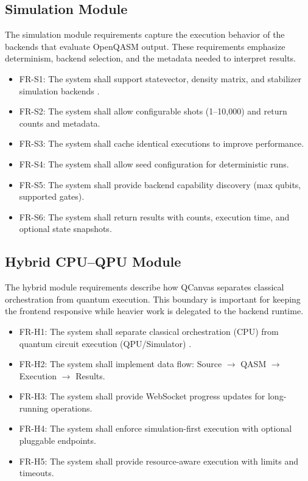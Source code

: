 \subsection{Simulation Module}
The simulation module requirements capture the execution behavior of the backends that evaluate OpenQASM output. These requirements emphasize determinism, backend selection, and the metadata needed to interpret results.
\begin{itemize}
    \item FR-S1: The system shall support statevector, density matrix, and stabilizer simulation backends \cite{nielsen2010quantum}.
    \item FR-S2: The system shall allow configurable shots (1–10,000) and return counts and metadata.
    \item FR-S3: The system shall cache identical executions to improve performance.
    \item FR-S4: The system shall allow seed configuration for deterministic runs.
    \item FR-S5: The system shall provide backend capability discovery (max qubits, supported gates).
    \item FR-S6: The system shall return results with counts, execution time, and optional state snapshots.
\end{itemize}

\subsection{Hybrid CPU–QPU Module}
The hybrid module requirements describe how QCanvas separates classical orchestration from quantum execution. This boundary is important for keeping the frontend responsive while heavier work is delegated to the backend runtime.
\begin{itemize}
    \item FR-H1: The system shall separate classical orchestration (CPU) from quantum circuit execution (QPU/Simulator) \cite{peruzzo2014variational}.
    \item FR-H2: The system shall implement data flow: Source $\rightarrow$ QASM $\rightarrow$ Execution $\rightarrow$ Results.
    \item FR-H3: The system shall provide WebSocket progress updates for long-running operations.
    \item FR-H4: The system shall enforce simulation-first execution with optional pluggable endpoints.
    \item FR-H5: The system shall provide resource-aware execution with limits and timeouts.
\end{itemize}

